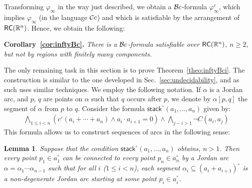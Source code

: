 \documentclass{article}
\newtheorem{lemma}[theorem]{Lemma}
\newcommand{\ic}{c^\circ}
\newcommand{\R}{\mathbb{R}}
\newcommand{\RC}{{\sf RC}}
\newcommand{\ti}[2][]{{#2}^{\circ_{#1}}}
\newcommand{\stacki}{\ti{\mathsf{stack}}}
\newenvironment{swetheorem}[1]{\par\medskip\noindent\textbf{#1.}\hspace*{0.5em}\em}{\par\smallskip}
\renewcommand{\phi}{\varphi}
\begin{document}
Transforming $\phi_\infty$ in the way just described, we obtain a
$\mathcal{B}c$-formula $\phi_\infty^c$, which implies $\phi_\infty$ (in the
language $\mathcal{C}c$) and which is satisfiable by the arrangement of
$\RC(\R^n)$. Hence, we obtain the following:
\begin{swetheorem}{Corollary~\ref{cor:inftyBc}} 
There is a $\mathcal{B}c$-formula satisfiable over $\RC(\R^n)$, $n \geq 2$,
but not by regions with finitely many components.
\end{swetheorem}

The only remaining task in this section is to prove Theorem~\ref{theo:inftyBci}.
The construction is similar to the one developed in Sec.~\ref{sec:undecidability},
and as such uses similar techniques. We employ the following notation. 
If $\alpha$ is a Jordan arc, and $p$, $q$ are points on $\alpha$ such that 
$q$ occurs after $p$, we denote by $\alpha[p,q]$ the segment of $\alpha$ from 
$p$ to $q$.
Consider the formula $\stacki(a_1,\ldots, a_n)$ given by:
\begin{align*}
	\bigwedge_{1\leq i<n} \left(\ic(a_i+\cdots+a_n)\land a_i\cdot a_{i+1}=0\right)
	\land \bigwedge_{j-i>1} \lnot C(a_i,a_j)
\end{align*}
This formula allows us to construct sequences of arcs in the following
sense:
\begin{lemma}\label{lma:StackLemmai} 
Suppose that the condition $\stacki(a_1,\ldots,a_n)$ obtains,
$n>1$. Then every point $p_1\in \ti a_1$ can be connected to every
point $p_n\in \ti a_n$ by a Jordan arc
$\alpha=\alpha_1\cdots\alpha_{n-1}$ such that for all $i$ \textup{(}$1\leq i<
n$\textup{)}, each segment $\alpha_i\subseteq \ti{(a_i+a_{i+1})}$ is a
non-degenerate Jordan arc starting at some point $p_i\in\ti a_i$.
\end{lemma}
\end{document}
